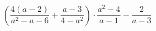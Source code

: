 \begin{ex}[type=expression]
	\begin{condition}
		\( \left( \dfrac{4(a-2)}{a^2-a-6}+\dfrac{a-3}{4-a^2} \right)\cdot\dfrac{a^2-4}{a-1}-\dfrac{2}{a-3} \)
	\end{condition}
\end{ex}